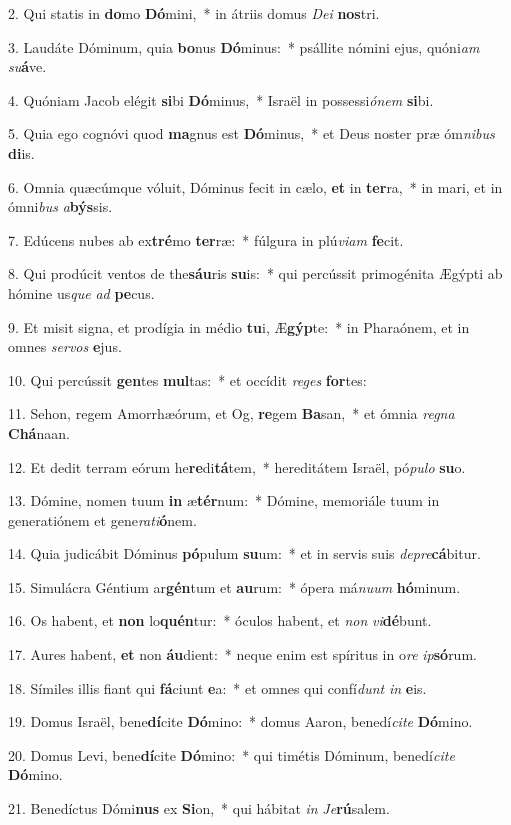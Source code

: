 2. Qui statis in \textbf{do}mo \textbf{Dó}mini,~*  in átriis domus \textit{De}\textit{i} \textbf{nos}tri.\

3. Laudáte Dóminum, quia \textbf{bo}nus \textbf{Dó}minus:~*  psállite nómini ejus, quóni\textit{am} \textit{su}\textbf{á}ve.\

4. Quóniam Jacob elégit \textbf{si}bi \textbf{Dó}minus,~*  Israël in possessi\textit{ó}\textit{nem} \textbf{si}bi.\

5. Quia ego cognóvi quod \textbf{ma}gnus est \textbf{Dó}minus,~*  et Deus noster præ óm\textit{ni}\textit{bus} \textbf{di}is.\

6. Omnia quæcúmque vóluit, Dóminus fecit in cælo, \textbf{et} in \textbf{ter}ra,~*  in mari, et in ómni\textit{bus} \textit{a}\textbf{býs}sis.\

7. Edúcens nubes ab ex\textbf{tré}mo \textbf{ter}ræ:~*  fúlgura in plú\textit{vi}\textit{am} \textbf{fe}cit.\

8. Qui prodúcit ventos de the\textbf{sáu}ris \textbf{su}is:~*  qui percússit primogénita Ægýpti ab hómine us\textit{que} \textit{ad} \textbf{pe}cus.\

9. Et misit signa, et prodígia in médio \textbf{tu}i, Æ\textbf{gýp}te:~*  in Pharaónem, et in omnes \textit{ser}\textit{vos} \textbf{e}jus.\

10. Qui percússit \textbf{gen}tes \textbf{mul}tas:~*  et occídit \textit{re}\textit{ges} \textbf{for}tes:\

11. Sehon, regem Amorrhæórum, et Og, \textbf{re}gem \textbf{Ba}san,~*  et ómnia \textit{re}\textit{gna} \textbf{Chá}naan.\

12. Et dedit terram eórum he\textbf{re}di\textbf{tá}tem,~*  hereditátem Israël, pó\textit{pu}\textit{lo} \textbf{su}o.\

13. Dómine, nomen tuum \textbf{in} æ\textbf{tér}num:~*  Dómine, memoriále tuum in generatiónem et gene\textit{ra}\textit{ti}\textbf{ó}nem.\

14. Quia judicábit Dóminus \textbf{pó}pulum \textbf{su}um:~*  et in servis suis \textit{de}\textit{pre}\textbf{cá}bitur.\

15. Simulácra Géntium ar\textbf{gén}tum et \textbf{au}rum:~*  ópera má\textit{nu}\textit{um} \textbf{hó}minum.\

16. Os habent, et \textbf{non} lo\textbf{quén}tur:~*  óculos habent, et \textit{non} \textit{vi}\textbf{dé}bunt.\

17. Aures habent, \textbf{et} non \textbf{áu}dient:~*  neque enim est spíritus in o\textit{re} \textit{ip}\textbf{só}rum.\

18. Símiles illis fiant qui \textbf{fá}ciunt \textbf{e}a:~*  et omnes qui confí\textit{dunt} \textit{in} \textbf{e}is.\

19. Domus Israël, bene\textbf{dí}cite \textbf{Dó}mino:~*  domus Aaron, benedí\textit{ci}\textit{te} \textbf{Dó}mino.\

20. Domus Levi, bene\textbf{dí}cite \textbf{Dó}mino:~*  qui timétis Dóminum, benedí\textit{ci}\textit{te} \textbf{Dó}mino.\

21. Benedíctus Dómi\textbf{nus} ex \textbf{Si}on,~*  qui hábitat \textit{in} \textit{Je}\textbf{rú}salem.\


